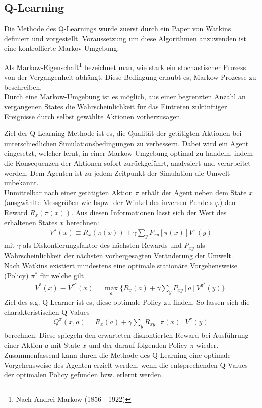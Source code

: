 	\subsection{Q-Learning}
	\label{subsec:rl_qlearning}
		Die Methode des Q-Learnings wurde zuerst durch ein Paper von Watkins \cite{Watkins1992} definiert und vorgestellt. Voraussetzung um diese Algorithmen anzuwenden ist eine kontrollierte Markov Umgebung.
		\begin{remark}
			Als Markow-Eigenschaft\footnote{Nach Andrei Markow (1856 - 1922)} bezeichnet man, wie stark ein stochastischer Prozess von der Vergangenheit abhängt. Diese Bedingung erlaubt es, Markow-Prozesse zu beschreiben.\\
			Durch eine Markow-Umgebung ist es möglich, aus einer begrenzten Anzahl an vergangenen States die Wahrscheinlichkeit für das Eintreten zukünftiger Ereignisse durch selbst gewählte Aktionen vorherzusagen. \cite{SilverRL}
		\end{remark}
		Ziel der Q-Learning Methode ist es, die Qualität der getätigten Aktionen bei unterschiedlichen Simulationsbedingungen zu verbessern. Dabei wird ein Agent eingesetzt, welcher lernt, in einer Markow-Umgebung optimal zu handeln, indem die Konsequenzen der Aktionen sofort zurückgeführt, analysiert und verarbeitet werden. Dem Agenten ist zu jedem Zeitpunkt der Simulation die Umwelt unbekannt.\\
		Unmittelbar nach einer getätigten Aktion $\pi$ erhält der Agent neben dem State $x$ (ausgwählte Messgrößen wie bspw. der Winkel des inversen Pendels $\varphi$) den Reward $R_x(\pi(x))$. Aus diesen Informationen lässt sich der Wert des erhaltenen States $x$ berechnen:
		\begin{align}
			V^\pi(x) \equiv R_x(\pi(x)) + \gamma \sum_{y}P_{xy}[\pi(x)]V^\pi(y)
		\end{align}
		mit $\gamma$ als Diskontierungsfaktor des nächsten Rewards und $P_{xy}$ als Wahrscheinlichkeit der nächsten vorhergesagten Veränderung der Umwelt.\\
		Nach Watkins existiert mindestens eine optimale stationäre Vorgehensweise (\grqq Policy\glqq) $\pi^*$ für welche gilt
		\begin{align}
			V^*(x) \equiv V^{\pi^*}(x) = \max_{\substack{a}} \bigg\{R_x(a) + \gamma \sum_{y}P_{xy}[a]V^{\pi^*}(y)\bigg\}.
		\end{align}
		Ziel des s.g. \grqq Q-Learner \glqq{} ist es, diese optimale Policy zu finden. So lassen sich die charakteristischen Q-Values
		\begin{align}
			Q^\pi(x,a) = R_x(a) + \gamma \sum_{y}R_{xy}[\pi(x)]V^\pi(y)
		\end{align}
		berechnen. Diese spiegeln den erwarteten diskontierten Reward bei Ausführung einer Aktion $a$ mit State $x$ und der darauf folgenden Policy $\pi$ wieder. Zusammenfassend kann durch die Methode des Q-Learning eine optimale Vorgehensweise des Agenten erzielt werden, wenn die entsprechenden Q-Values der optimalen Policy gefunden bzw. erlernt werden.
